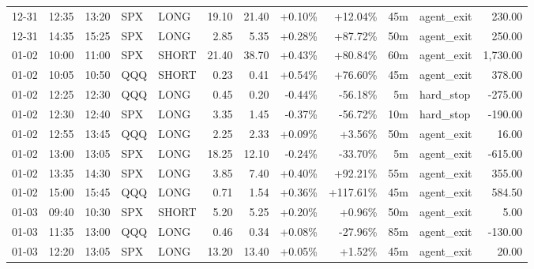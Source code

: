 \documentclass[11pt,a4paper,twoside]{article}
\begin{document}
\begin{center}
\begin{longtable}{>{\color{txtmain}}l l l l l r r r r r >{\color{txtmain}}l r}
12-31 & 12:35 & 13:20 & SPX & LONG & 19.10 & 21.40 & \textcolor{wingreen}{+0.10\%} & \textcolor{wingreen}{+12.04\%} & 45m & agent\_exit & \textcolor{wingreen}{230.00} \\
12-31 & 14:35 & 15:25 & SPX & LONG & 2.85 & 5.35 & \textcolor{wingreen}{+0.28\%} & \textcolor{wingreen}{+87.72\%} & 50m & agent\_exit & \textcolor{wingreen}{250.00} \\
01-02 & 10:00 & 11:00 & SPX & SHORT & 21.40 & 38.70 & \textcolor{wingreen}{+0.43\%} & \textcolor{wingreen}{+80.84\%} & 60m & agent\_exit & \textcolor{wingreen}{1,730.00} \\
01-02 & 10:05 & 10:50 & QQQ & SHORT & 0.23 & 0.41 & \textcolor{wingreen}{+0.54\%} & \textcolor{wingreen}{+76.60\%} & 45m & agent\_exit & \textcolor{wingreen}{378.00} \\
01-02 & 12:25 & 12:30 & QQQ & LONG & 0.45 & 0.20 & \textcolor{lossred}{-0.44\%} & \textcolor{lossred}{-56.18\%} & 5m & hard\_stop & \textcolor{lossred}{-275.00} \\
01-02 & 12:30 & 12:40 & SPX & LONG & 3.35 & 1.45 & \textcolor{lossred}{-0.37\%} & \textcolor{lossred}{-56.72\%} & 10m & hard\_stop & \textcolor{lossred}{-190.00} \\
01-02 & 12:55 & 13:45 & QQQ & LONG & 2.25 & 2.33 & \textcolor{wingreen}{+0.09\%} & \textcolor{wingreen}{+3.56\%} & 50m & agent\_exit & \textcolor{wingreen}{16.00} \\
01-02 & 13:00 & 13:05 & SPX & LONG & 18.25 & 12.10 & \textcolor{lossred}{-0.24\%} & \textcolor{lossred}{-33.70\%} & 5m & agent\_exit & \textcolor{lossred}{-615.00} \\
01-02 & 13:35 & 14:30 & SPX & LONG & 3.85 & 7.40 & \textcolor{wingreen}{+0.40\%} & \textcolor{wingreen}{+92.21\%} & 55m & agent\_exit & \textcolor{wingreen}{355.00} \\
01-02 & 15:00 & 15:45 & QQQ & LONG & 0.71 & 1.54 & \textcolor{wingreen}{+0.36\%} & \textcolor{wingreen}{+117.61\%} & 45m & agent\_exit & \textcolor{wingreen}{584.50} \\
01-03 & 09:40 & 10:30 & SPX & SHORT & 5.20 & 5.25 & \textcolor{wingreen}{+0.20\%} & \textcolor{wingreen}{+0.96\%} & 50m & agent\_exit & \textcolor{wingreen}{5.00} \\
01-03 & 11:35 & 13:00 & QQQ & LONG & 0.46 & 0.34 & \textcolor{wingreen}{+0.08\%} & \textcolor{lossred}{-27.96\%} & 85m & agent\_exit & \textcolor{lossred}{-130.00} \\
01-03 & 12:20 & 13:05 & SPX & LONG & 13.20 & 13.40 & \textcolor{wingreen}{+0.05\%} & \textcolor{wingreen}{+1.52\%} & 45m & agent\_exit & \textcolor{wingreen}{20.00} \\

\end{longtable}
\end{center}
\end{document}
